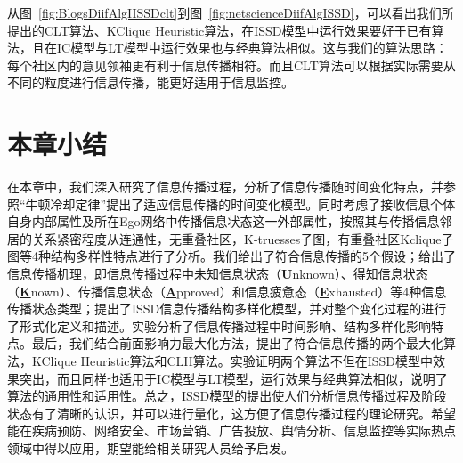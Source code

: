 从图~\ref{fig:BlogsDiifAlgIISSDclt}到图~\ref{fig:netscienceDiifAlgISSD}，可以看出我们所提出的CLT算法、KClique Heuristic算法，在ISSD模型中运行效果要好于已有算法，且在IC模型与LT模型中运行效果也与经典算法相似。这与我们的算法思路：每个社区内的意见领袖更有利于信息传播相符。而且CLT算法可以根据实际需要从不同的粒度进行信息传播，能更好适用于信息监控。

\section{本章小结}
在本章中，我们深入研究了信息传播过程，分析了信息传播随时间变化特点，并参照“牛顿冷却定律”提出了适应信息传播的时间变化模型。同时考虑了接收信息个体自身内部属性及所在Ego网络中传播信息状态这一外部属性，按照其与传播信息邻居的关系紧密程度从连通性，无重叠社区，K-truesses子图，有重叠社区Kclique子图等4种结构多样性特点进行了分析。我们给出了符合信息传播的5个假设；给出了信息传播机理，即信息传播过程中未知信息状态（\underline{\textbf{U}}nknown）、得知信息状态（\underline{\textbf{K}}nown）、传播信息状态（\underline{\textbf{A}}pproved）和信息疲惫态（\underline{\textbf{E}}xhausted）等4种信息传播状态类型；提出了ISSD信息传播结构多样化模型，并对整个变化过程的进行了形式化定义和描述。实验分析了信息传播过程中时间影响、结构多样化影响特点。最后，我们结合前面影响力最大化方法，提出了符合信息传播的两个最大化算法，KClique Heuristic算法和CLH算法。实验证明两个算法不但在ISSD模型中效果突出，而且同样也适用于IC模型与LT模型，运行效果与经典算法相似，说明了算法的通用性和适用性。总之，ISSD模型的提出使人们分析信息传播过程及阶段状态有了清晰的认识，并可以进行量化，这方便了信息传播过程的理论研究。希望能在疾病预防、网络安全、市场营销、广告投放、舆情分析、信息监控等实际热点领域中得以应用，期望能给相关研究人员给予启发。
